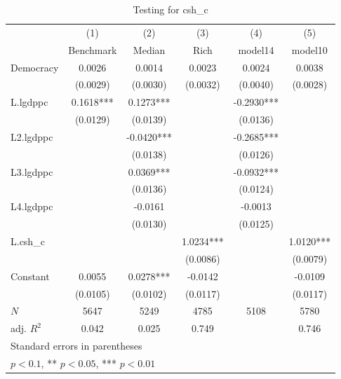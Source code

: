 \begin{table}[htbp]\centering
\def\sym#1{\ifmmode^{#1}\else\(^{#1}\)\fi}
\caption{Testing for csh\_c \label{tab:regression1}}
\begin{tabular}{l*{5}{c}}
\hline\hline
            &\multicolumn{1}{c}{(1)}&\multicolumn{1}{c}{(2)}&\multicolumn{1}{c}{(3)}&\multicolumn{1}{c}{(4)}&\multicolumn{1}{c}{(5)}\\
            &\multicolumn{1}{c}{Benchmark}&\multicolumn{1}{c}{Median}&\multicolumn{1}{c}{Rich}&\multicolumn{1}{c}{model14}&\multicolumn{1}{c}{model10}\\
\hline
Democracy   &      0.0026   &      0.0014   &      0.0023   &      0.0024   &      0.0038   \\
            &    (0.0029)   &    (0.0030)   &    (0.0032)   &    (0.0040)   &    (0.0028)   \\
[1em]
L.lgdppc    &      0.1618***&      0.1273***&               &     -0.2930***&               \\
            &    (0.0129)   &    (0.0139)   &               &    (0.0136)   &               \\
[1em]
L2.lgdppc   &               &     -0.0420***&               &     -0.2685***&               \\
            &               &    (0.0138)   &               &    (0.0126)   &               \\
[1em]
L3.lgdppc   &               &      0.0369***&               &     -0.0932***&               \\
            &               &    (0.0136)   &               &    (0.0124)   &               \\
[1em]
L4.lgdppc   &               &     -0.0161   &               &     -0.0013   &               \\
            &               &    (0.0130)   &               &    (0.0125)   &               \\
[1em]
L.csh\_c     &               &               &      1.0234***&               &      1.0120***\\
            &               &               &    (0.0086)   &               &    (0.0079)   \\
[1em]
Constant    &      0.0055   &      0.0278***&     -0.0142   &               &     -0.0109   \\
            &    (0.0105)   &    (0.0102)   &    (0.0117)   &               &    (0.0117)   \\
\hline
\(N\)       &        5647   &        5249   &        4785   &        5108   &        5780   \\
adj. \(R^{2}\)&       0.042   &       0.025   &       0.749   &               &       0.746   \\
\hline\hline
\multicolumn{6}{l}{\footnotesize Standard errors in parentheses}\\
\multicolumn{6}{l}{\footnotesize * \(p<0.1\), ** \(p<0.05\), *** \(p<0.01\)}\\
\end{tabular}
\end{table}
